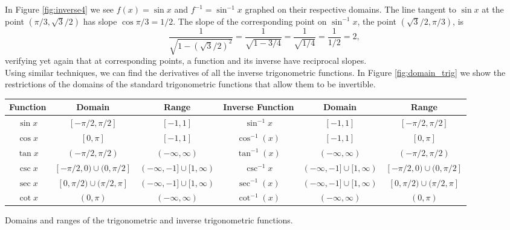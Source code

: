 %
{}
{}


In Figure \ref{fig:inverse4} we see $f(x) = \sin x$ and $f^{-1} = \sin^{-1} x$ graphed on their respective domains. The line tangent to $\sin x$ at the point $(\pi/3, \sqrt{3}/2)$ has slope $\cos \pi/3 = 1/2$. The slope of the corresponding point on $\sin^{-1}x$, the point $(\sqrt{3}/2,\pi/3)$, is $$\frac{1}{\sqrt{1-(\sqrt{3}/2)^2}} = \frac{1}{\sqrt{1-3/4}} = \frac{1}{\sqrt{1/4}} = \frac{1}{1/2}=2,$$ verifying yet again that at corresponding points, a function and its inverse have reciprocal slopes.\\

Using similar techniques, we can find the derivatives of all the inverse trigonometric functions. In Figure \ref{fig:domain_trig} we show the restrictions of the domains of the standard trigonometric functions that allow them to be invertible.\\

\begin{minipage}{\textwidth+200pt}
\small\noindent
\begin{tabular}{cccccc}
Function & Domain & Range &\parbox[b]{40pt}{\centering Inverse Function} & Domain & Range\\ \hline
\rule{0pt}{12pt} $\sin x$ & $[-\pi/2, \pi/2]$ & $[-1,1]$&$\sin^{-1} x$ & $[-1,1]$ & $[-\pi/2, \pi/2]$ \\
\rule{0pt}{12pt}$\cos x$ & $[0,\pi]$ & $[-1,1]$&$\cos^{-1}(x)$ & $[-1,1]$ & $[0,\pi]$ \\
\rule{0pt}{12pt}$\tan x$ & $(-\pi/2,\pi/2)$ & $(-\infty,\infty)$&$\tan^{-1}(x)$ & $(-\infty,\infty)$ & $(-\pi/2,\pi/2)$	\\
\rule{0pt}{12pt} $\csc x$ & $[-\pi/2,0)\cup (0, \pi/2]$ & $(-\infty,-1]\cup [1,\infty)$&$\csc^{-1} x$ & $(-\infty,-1]\cup [1,\infty)$ & $[-\pi/2,0)\cup (0, \pi/2]$  \\
\rule{0pt}{12pt}$\sec x$ & $[0,\pi/2)\cup (\pi/2,\pi]$ & $(-\infty,-1]\cup [1,\infty)$&$\sec^{-1}(x)$ & $(-\infty,-1]\cup [1,\infty)$ & $[0,\pi/2)\cup (\pi/2,\pi]$ \\
\rule{0pt}{12pt}$\cot x$ & $(0,\pi)$ & $(-\infty,\infty)$&$\cot^{-1}(x)$ &  $ (-\infty,\infty)$ & $(0,\pi)$	
\end{tabular}
\captionsetup{type=figure}
\caption{Domains and ranges of the trigonometric and inverse trigonometric functions.}\label{fig:domain_trig}
\end{minipage}

